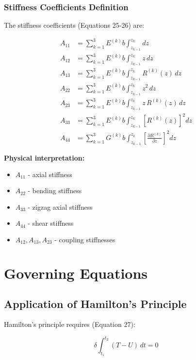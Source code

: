 \documentclass[12pt,a4paper]{article}
\begin{document}
\subsubsection{Stiffness Coefficients Definition}

The stiffness coefficients (Equations 25-26) are:

\begin{align}
A_{11} &= \sum_{k=1}^{3} E^{(k)} b \int_{z_{k-1}}^{z_k} dz \\[6pt]
A_{12} &= \sum_{k=1}^{3} E^{(k)} b \int_{z_{k-1}}^{z_k} z \, dz \\[6pt]
A_{13} &= \sum_{k=1}^{3} E^{(k)} b \int_{z_{k-1}}^{z_k} R^{(k)}(z) \, dz \\[6pt]
A_{22} &= \sum_{k=1}^{3} E^{(k)} b \int_{z_{k-1}}^{z_k} z^2 \, dz \\[6pt]
A_{23} &= \sum_{k=1}^{3} E^{(k)} b \int_{z_{k-1}}^{z_k} z \, R^{(k)}(z) \, dz \\[6pt]
A_{33} &= \sum_{k=1}^{3} E^{(k)} b \int_{z_{k-1}}^{z_k} \left[R^{(k)}(z)\right]^2 dz \\[6pt]
A_{44} &= \sum_{k=1}^{3} G^{(k)} b \int_{z_{k-1}}^{z_k} \left[ \frac{\partial R^{(k)}}{\partial z} \right]^2 dz
\end{align}

\textbf{Physical interpretation:}
\begin{itemize}
\item $A_{11}$ - axial stiffness
\item $A_{22}$ - bending stiffness
\item $A_{33}$ - zigzag axial stiffness
\item $A_{44}$ - shear stiffness
\item $A_{12}, A_{13}, A_{23}$ - coupling stiffnesses
\end{itemize}

\section{Governing Equations}

\subsection{Application of Hamilton's Principle}

Hamilton's principle requires (Equation 27):

\begin{equation}
\delta \int_{t_1}^{t_2} (T - U) \, dt = 0
\end{equation}
\end{document}
